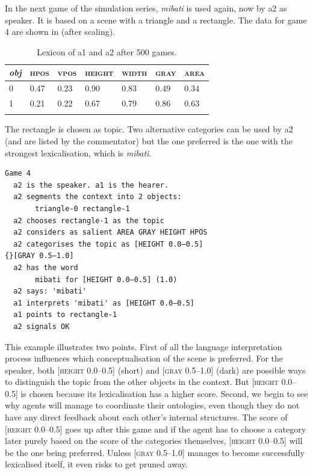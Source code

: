 In the next game of the simulation series, \textit{mibati}
is used again, now by {\bfshape  a2} as speaker. It is 
based on a scene with a triangle and a rectangle.
The data for game 4 are shown in  (after scaling).  


\begin{table}
\begin{center}
\begin{tabular}{ l  l  l  l  l  l  l }
\lsptoprule
{\itshape obj} & \textsc{hpos} & \textsc{vpos} & \textsc{height} & \textsc{width} & \textsc{gray} & \textsc{area} \\ \midrule
0 & 0.47 & 0.23 & 0.90 & 0.83 & 0.49 & 0.34\\ 
1 & 0.21 & 0.22 & 0.67 & 0.79 & 0.86 & 0.63\\ 
\lspbottomrule
\end{tabular}
\caption{\label{tab:mibati}Lexicon of a1 and a2 after 500 games.}
\end{center}
\end{table}
The rectangle is chosen as topic. Two alternative
categories can be used by {\bfshape  a2} (and are listed
by the commentator) but the one preferred
is the one with the strongest lexicalisation, which is 
\textit{mibati}.
\begin{verbatim}
Game 4
  a2 is the speaker. a1 is the hearer. 
  a2 segments the context into 2 objects: 
       triangle-0 rectangle-1
  a2 chooses rectangle-1 as the topic 
  a2 considers as salient AREA GRAY HEIGHT HPOS
  a2 categorises the topic as [HEIGHT 0.0–0.5] 
{}[GRAY 0.5–1.0]
  a2 has the word
       mibati for [HEIGHT 0.0–0.5] (1.0)
  a2 says: 'mibati'
  a1 interprets 'mibati' as [HEIGHT 0.0–0.5]
  a1 points to rectangle-1
  a2 signals OK 
\end{verbatim}

This example illustrates two points. First of all the 
language interpretation process influences 
which conceptualisation of the scene is preferred. For 
the speaker, both [\textsc{height} 0.0–0.5] (short) and [\textsc{gray} 0.5–1.0]
(dark) are possible ways to distinguish the topic from the 
other objects in the context. But [\textsc{height} 0.0–0.5] is 
chosen because its lexicalisation has a higher score. 
Second, we begin to see why agents will manage to 
coordinate their ontologies, even though they do not 
have any direct feedback about each other's internal 
structures. The score of [\textsc{height} 0.0–0.5] goes up after
this game and if the 
agent has to choose a category later purely based on 
the score of the categories themselves, [\textsc{height} 0.0–0.5] will 
be the one being preferred. Unless [\textsc{gray} 0.5–1.0] manages
to become successfully lexicalised itself, it even risks to 
get pruned away. 



